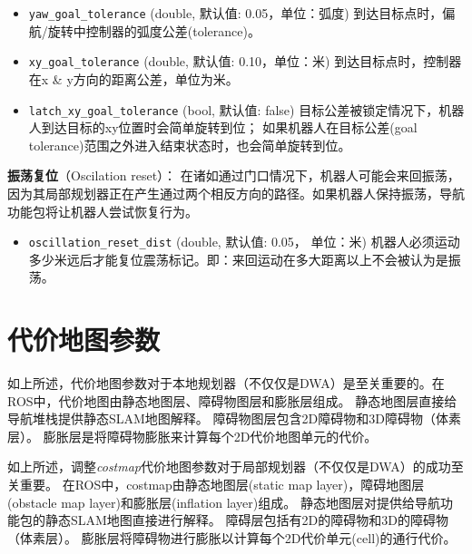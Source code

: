 \begin{itemize}
	\item \texttt{yaw_goal_tolerance} (double, 默认值: 0.05，单位：弧度)
	到达目标点时，偏航/旋转中控制器的弧度公差(tolerance)。
	
	\item \texttt{xy_goal_tolerance} (double, 默认值: 0.10，单位：米)
	到达目标点时，控制器在x \& y方向的距离公差，单位为米。
	
	\item \texttt{latch_xy_goal_tolerance} (bool, 默认值: false) 
	目标公差被锁定情况下，机器人到达目标的xy位置时会简单旋转到位；
	如果机器人在目标公差(goal tolerance)范围之外进入结束状态时，也会简单旋转到位。
	
\end{itemize}

\textbf{振荡复位}（Oscilation reset）：
在诸如通过门口情况下，机器人可能会来回振荡，因为其局部规划器正在产生通过两个相反方向的路径。如果机器人保持振荡，导航功能包将让机器人尝试恢复行为。

\begin{itemize}
	\item \texttt{oscillation_reset_dist} (double, 默认值: 0.05， 单位：米) 
	机器人必须运动多少米远后才能复位震荡标记。即：来回运动在多大距离以上不会被认为是振荡。
\end{itemize}



\section[Costmap Parameters]{代价地图参数}
如上所述，代价地图参数对于本地规划器（不仅仅是DWA）是至关重要的。在ROS中，代价地图由静态地图层、障碍物图层和膨胀层组成。
静态地图层直接给导航堆栈提供静态SLAM地图解释。
障碍物图层包含2D障碍物和3D障碍物（体素层）。
膨胀层是将障碍物膨胀来计算每个2D代价地图单元的代价。

如上所述，调整\textit{costmap}代价地图参数对于局部规划器（不仅仅是DWA）的成功至关重要。 
在ROS中，costmap由静态地图层(static map layer)，障碍地图层(obstacle map layer)和膨胀层(inflation layer)组成。 
静态地图层对提供给导航功能包的静态SLAM地图直接进行解释。 
障碍层包括有2D的障碍物和3D的障碍物（体素层）。 
膨胀层将障碍物进行膨胀以计算每个2D代价单元(cell)的通行代价。

